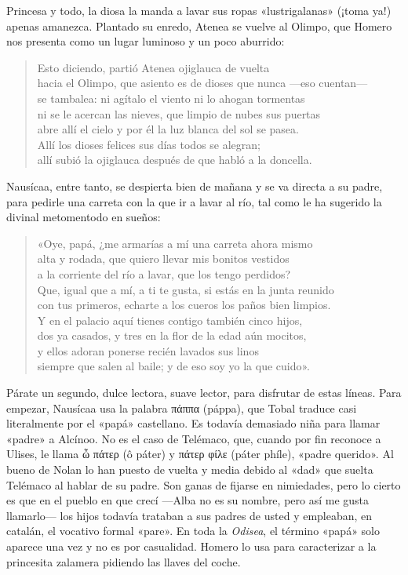 \documentclass[11pt,a4paper]{article}
\newcommand{\gr}[1]{\foreignlanguage{greek}{#1}}
\begin{document}
Princesa y todo, la diosa la manda a lavar sus ropas «lustrigalanas» (¡toma ya!) apenas amanezca. Plantado su enredo, Atenea se vuelve al Olimpo, que Homero nos presenta como un lugar luminoso y un poco aburrido:

\begin{verse}
Esto diciendo, partió Atenea ojiglauca de vuelta\\
hacia el Olimpo, que asiento es de dioses que nunca ---eso cuentan---\\
se tambalea: ni agítalo el viento ni lo ahogan tormentas\\
ni se le acercan las nieves, que limpio de nubes sus puertas\\
abre allí el cielo y por él la luz blanca del sol se pasea.\\
Allí los dioses felices sus días todos se alegran;\\
allí subió la ojiglauca después de que habló a la doncella.
\end{verse}

Nausícaa, entre tanto, se despierta bien de mañana y se va directa a su padre, para pedirle una carreta con la que ir a lavar al río, tal como le ha sugerido la divinal metomentodo en sueños:

\begin{verse}
«Oye, papá, ¿me armarías a mí una carreta ahora mismo\\
alta y rodada, que quiero llevar mis bonitos vestidos\\
a la corriente del río a lavar, que los tengo perdidos?\\
Que, igual que a mí, a ti te gusta, si estás en la junta reunido\\
con tus primeros, echarte a los cueros los paños bien limpios.\\
Y en el palacio aquí tienes contigo también cinco hijos,\\
dos ya casados, y tres en la flor de la edad aún mocitos,\\
y ellos adoran ponerse recién lavados sus linos\\
siempre que salen al baile; y de eso soy yo la que cuido».
\end{verse}

Párate un segundo, dulce lectora, suave lector, para disfrutar de estas líneas. Para empezar, Nausícaa usa la palabra \gr{πάππα} (páppa), que Tobal traduce casi literalmente por el «papá» castellano. Es todavía demasiado niña para llamar «padre» a Alcínoo. No es el caso de Telémaco, que, cuando por fin reconoce a Ulises, le llama \gr{ὦ πάτερ} (ô páter) y \gr{πάτερ φίλε} (páter phíle), «padre querido». Al bueno de Nolan lo han puesto de vuelta y media debido al «dad» que suelta Telémaco al hablar de su padre. Son ganas de fijarse en nimiedades, pero lo cierto es que en el pueblo en que crecí ---Alba no es su nombre, pero así me gusta llamarlo--- los hijos todavía trataban a sus padres de usted y empleaban, en catalán, el vocativo formal «pare». En toda la \emph{Odisea}, el término «papá» solo aparece una vez y no es por casualidad. Homero lo usa para caracterizar a la princesita zalamera pidiendo las llaves del coche.
\end{document}
